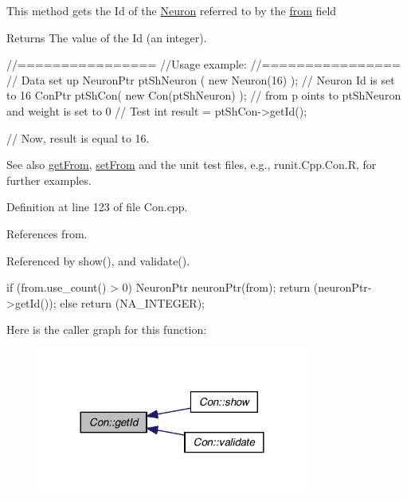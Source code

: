 This method gets the Id of the \hyperlink{class_neuron}{Neuron} referred to by the \hyperlink{class_con_a7c05f90dff56fd26c1fa0f042bba67a6}{from} field \begin{DoxyReturn}{Returns}
The value of the Id (an integer).
\end{DoxyReturn}

\begin{DoxyCode}
        //================
        //Usage example:
        //================
        // Data set up
                        NeuronPtr ptShNeuron ( new Neuron(16) );        // Neuron
       Id is set to 16
                        ConPtr ptShCon( new Con(ptShNeuron) );          // from p
      oints to ptShNeuron and weight is set to 0
        // Test
                        int result = ptShCon->getId();

        // Now, result is equal to 16.
\end{DoxyCode}


\begin{DoxySeeAlso}{See also}
\hyperlink{class_con_a0c126eb4479324b156768e0810723423}{getFrom}, \hyperlink{class_con_a927378392a3ee1fe958b1670cb72e61d}{setFrom} and the unit test files, e.g., runit.Cpp.Con.R, for further examples. 
\end{DoxySeeAlso}


Definition at line 123 of file Con.cpp.



References from.



Referenced by show(), and validate().


\begin{DoxyCode}
{
  if (from.use_count() > 0)
    {
      NeuronPtr neuronPtr(from);
      return (neuronPtr->getId());
    }
  else
    {
      return (NA_INTEGER);
    }
}
\end{DoxyCode}


Here is the caller graph for this function:\nopagebreak
\begin{figure}[H]
\begin{center}
\leavevmode
\includegraphics[width=252pt]{class_con_ad12ce81a557eadb2a00b10d5b5f4adb6_icgraph}
\end{center}
\end{figure}


